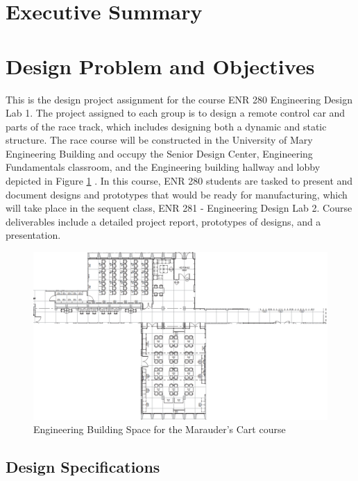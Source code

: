 \documentclass[fleqn,12pt]{project}
\affiliation{\textsuperscript{1}\textit{School of Engineering, 
  University of Mary, Bismarck, North Dakota}}
\affiliation{*ajgarcia@umary.edu}
\begin{document}
\flushbottom
\maketitle
\newpage
\tableofcontents
\thispagestyle{empty}
\newpage
\section*{Executive Summary}

\newpage
\section{Design Problem and Objectives}

This is the design project assignment for the course ENR 280 Engineering Design Lab 1. The project assigned to each group is to design a remote control car and parts of the race track, which includes designing both a dynamic and static structure. The race course will be constructed in the University of Mary Engineering Building and occupy the Senior Design Center, Engineering Fundamentals classroom, and the Engineering building hallway and lobby depicted in Figure \ref{fig:Fig1} . In this course, ENR 280 students are tasked to present and document designs and prototypes that would be ready for manufacturing, which will take place in the sequent class, ENR 281 - Engineering Design Lab 2. Course deliverables include a detailed project report, prototypes of designs, and a presentation. 

\begin{figure}\centering
\includegraphics[width=17cm]{Figures/Floorplan}
\caption{Engineering Building Space for the Marauder's Cart course}
\label{fig:Fig1}
\end{figure}
\subsection{Design Specifications}
\end{document}
